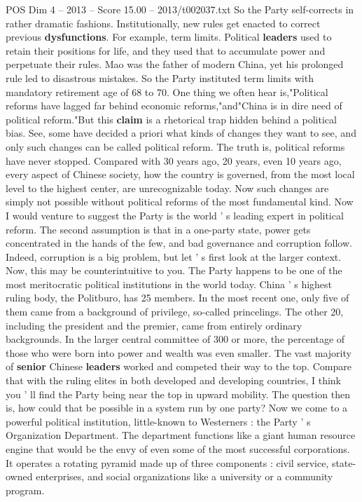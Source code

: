 \begin{textsample}{POS Dim 4 – 2013 – Score 15.00 – 2013/t002037.txt}
So the Party self-corrects in rather dramatic fashions.
Institutionally, new rules get enacted to correct previous \textbf{dysfunctions}.
For example, term limits.
Political \textbf{leaders} used to retain their positions for life, and they used that to accumulate power and perpetuate their rules.
Mao was the father of modern China, yet his prolonged rule led to disastrous mistakes.
So the Party instituted term limits with mandatory retirement age of 68 to 70.
One thing we often hear is,"Political reforms have lagged far behind economic reforms,"and"China is in dire need of political reform."But this \textbf{claim} is a rhetorical trap hidden behind a political bias.
See, some have decided a priori what kinds of changes they want to see, and only such changes can be called political reform.
The truth is, political reforms have never stopped.
Compared with 30 years ago, 20 years, even 10 years ago, every aspect of Chinese society, how the country is governed, from the most local level to the highest center, are unrecognizable today.
Now such changes are simply not possible without political reforms of the most fundamental kind.
Now I would venture to suggest the Party is the world ' s leading expert in political reform.
The second assumption is that in a one-party state, power gets concentrated in the hands of the few, and bad governance and corruption follow.
Indeed, corruption is a big problem, but let ' s first look at the larger context.
Now, this may be counterintuitive to you.
The Party happens to be one of the most meritocratic political institutions in the world today.
China ' s highest ruling body, the Politburo, has 25 members.
In the most recent one, only five of them came from a background of privilege, so-called princelings.
The other 20, including the president and the premier, came from entirely ordinary backgrounds.
In the larger central committee of 300 or more, the percentage of those who were born into power and wealth was even smaller.
The vast majority of \textbf{senior} Chinese \textbf{leaders} worked and competed their way to the top.
Compare that with the ruling elites in both developed and developing countries, I think you ' ll find the Party being near the top in upward mobility.
The question then is, how could that be possible in a system run by one party?
Now we come to a powerful political institution, little-known to Westerners : the Party ' s Organization Department.
The department functions like a giant human resource engine that would be the envy of even some of the most successful corporations.
It operates a rotating pyramid made up of three components : civil service, state-owned enterprises, and social organizations like a university or a community program.

\end{textsample}
